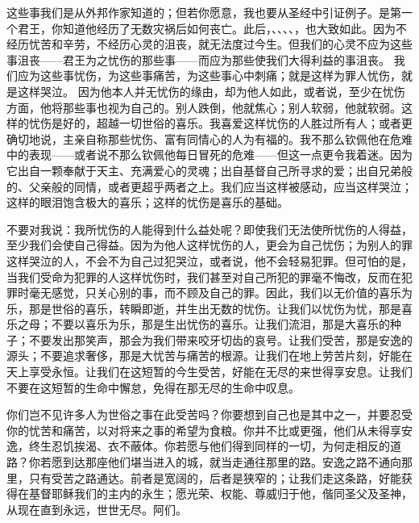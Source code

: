 这些事我们是从外邦作家知道的；但若你愿意，我也要从圣经中引证例子。是第一个君王，你知道他经历了无数灾祸后如何丧亡。此后，、、、、，也大致如此。因为不经历忧苦和辛劳，不经历心灵的沮丧，就无法度过今生。但我们的心灵不应为这些事沮丧——君王为之忧伤的那些事——而应为那些使我们大得利益的事沮丧。 我们应为这些事忧伤，为这些事痛苦，为这些事心中刺痛；就是这样为罪人忧伤，就是这样哭泣。 因为他本人并无忧伤的缘由，却为他人如此，或者说，至少在忧伤方面，他将那些事也视为自己的。别人跌倒，他就焦心；别人软弱，他就软弱。这样的忧伤是好的，超越一切世俗的喜乐。我喜爱这样忧伤的人胜过所有人；或者更确切地说，主亲自称那些忧伤、富有同情心的人为有福的。我不那么钦佩他在危难中的表现——或者说不那么钦佩他每日冒死的危难——但这一点更令我着迷。因为它出自一颗奉献于天主、充满爱心的灵魂；出自基督自己所寻求的爱；出自兄弟般的、父亲般的同情，或者更超乎两者之上。我们应当这样被感动，应当这样哭泣；这样的眼泪饱含极大的喜乐；这样的忧伤是喜乐的基础。\par

不要对我说：我所忧伤的人能得到什么益处呢？即使我们无法使所忧伤的人得益，至少我们会使自己得益。因为为他人这样忧伤的人，更会为自己忧伤；为别人的罪这样哭泣的人，不会不为自己过犯哭泣，或者说，他不会轻易犯罪。但可怕的是，当我们受命为犯罪的人这样忧伤时，我们甚至对自己所犯的罪毫不悔改，反而在犯罪时毫无感觉，只关心别的事，而不顾及自己的罪。因此，我们以无价值的喜乐为乐，那是世俗的喜乐，转瞬即逝，并生出无数的忧伤。让我们以忧伤为忧，那是喜乐之母；不要以喜乐为乐，那是生出忧伤的喜乐。让我们流泪，那是大喜乐的种子；不要发出那笑声，那会为我们带来咬牙切齿的哀号。让我们受苦，那是安逸的源头；不要追求奢侈，那是大忧苦与痛苦的根源。让我们在地上劳苦片刻，好能在天上享受永恒。让我们在这短暂的今生受苦，好能在无尽的来世得享安息。让我们不要在这短暂的生命中懈怠，免得在那无尽的生命中叹息。\par

你们岂不见许多人为世俗之事在此受苦吗？你要想到自己也是其中之一，并要忍受你的忧苦和痛苦，以对将来之事的希望为食粮。你并不比或更强，他们从未得享安逸，终生忍饥挨渴、衣不蔽体。你若愿与他们得到同样的一切，为何走相反的道路？你若愿到达那座他们堪当进入的城，就当走通往那里的路。安逸之路不通向那里，只有受苦之路通达。前者是宽阔的，后者是狭窄的；让我们走这条路，好能获得在基督耶稣我们的主内的永生；愿光荣、权能、尊威归于他，偕同圣父及圣神，从现在直到永远，世世无尽。阿们。\par

